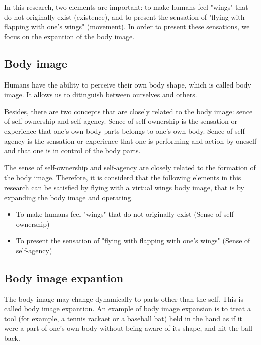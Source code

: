 \documentclass[letterpaper, 10 pt, conference]{ieeeconf}  %
\begin{document}
        In this research, two elements are important: to make humans feel "wings" that do not originally exist (existence), and to present the sensation of "flying with flapping with one's wings" (movement).  
        In order to present these sensations, we focus on the expantion of the body image.  

        \subsection{Body image}
                Humans have the ability to perceive their own body shape, which is called body image\cite{head1911sensory}.  
                It allows us to ditinguish between ourselves and others.

                Besides, there are two concepts that are closely related to the body image: sence of self-ownership and self-agency.
                Sence of self-ownership is the sensation or experience that one's own body parts belongs to one's own body.  
                Sence of self-agency is the sensation or experience that one is performing and action by oneself and that one is in control of the body parts.  
                
                The sense of self-ownership and self-agency are closely related to  the formation of the body image.  
                Therefore, it is considerd that the following elements in this research can be satisfied by flying with a virtual wings body image, that is by expanding the body image and operating.  

                \begin{itemize}
                        \item To make humans feel "wings" that do not originally exist (Sense of self-ownership)
                        \item To present the sensation of "flying with flapping with one's wings" (Sense of self-agency)
                \end{itemize}

        \subsection{Body image expantion}
                The body image may change dynamically to parts other than the self.  
                This is called body image expantion.  
                An example of body image expansion is to treat a tool (for example, a tennis rackaet or a baseball bat) held in the hand as if it were a part of one's own body without being aware of its shape, and hit the ball back\cite{botvinick1998rubber}.
                
\end{document}
